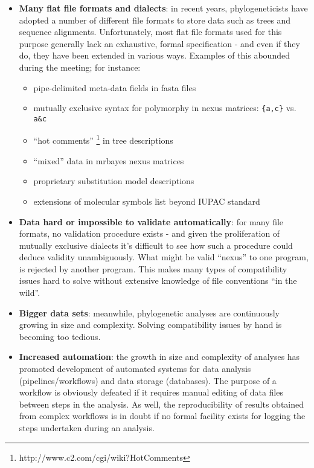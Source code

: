 \documentclass{article}
\begin{document}
\begin{itemize}

\item \textbf{Many flat file formats and dialects}: in recent years, phylogeneticists have adopted a number of different file formats 
to store data such as trees and sequence alignments. Unfortunately, most flat file formats used for this purpose generally lack 
an exhaustive, formal specification - and even if they do, they have been extended in various ways. Examples of this abounded 
during the meeting; for instance:

\begin{itemize}

\item pipe-delimited meta-data fields in fasta files

\item mutually exclusive syntax for polymorphy in nexus matrices: \verb={a,c}= vs. \verb=a&c=
 
\item ``hot comments'' \footnote{http://www.c2.com/cgi/wiki?HotComments} in tree descriptions
 
\item ``mixed'' data in mrbayes nexus matrices 

\item proprietary substitution model descriptions

\item extensions of molecular symbols list beyond IUPAC standard

\end{itemize}

\item \textbf{Data hard or impossible to validate automatically}: for many file formats, no validation procedure exists - and given the 
proliferation of mutually exclusive dialects it's difficult to see how such a procedure could deduce validity unambiguously. What 
might be valid ``nexus'' to one program, is rejected by another program. This makes many types of compatibility issues hard to solve 
without extensive knowledge of file conventions ``in the wild''.

\item \textbf{Bigger data sets}: meanwhile, phylogenetic analyses are continuously growing in size and complexity. Solving compatibility 
issues by hand is becoming too tedious.

\item \textbf{Increased automation}: the growth in size and complexity of analyses has promoted development of automated systems for data 
analysis (pipelines/workflows) and data storage (databases). The purpose of a workflow is obviously defeated if it requires manual 
editing of data files between steps in the analysis. As well, the reproducibility of results obtained from complex workflows is in 
doubt if no formal facility exists for logging the steps undertaken during an analysis. 


\end{itemize}
\end{document}
